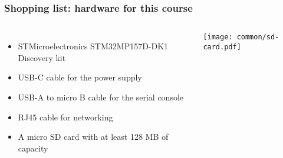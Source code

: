 \begin{frame}
\frametitle{Shopping list: hardware for this course}
  \begin{columns}
    \footnotesize
    \begin{itemize}
      \item STMicroelectronics STM32MP157D-DK1 Discovery kit
      \item USB-C cable for the power supply
      \item USB-A to micro B cable for the serial console
      \item RJ45 cable for networking
      \item A micro SD card with at least 128 MB of capacity
    \end{itemize}
    \vspace{1cm}
    \texttt{[image: common/sd-card.pdf]}
  \end{columns}
\end{frame}
